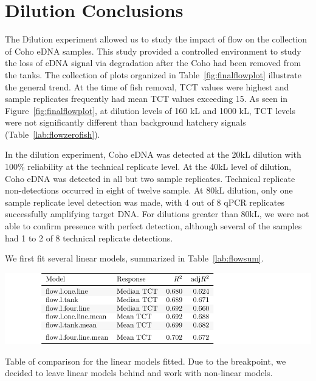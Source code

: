 \section{Dilution Conclusions}

The Dilution experiment allowed us to study the impact of flow on the collection of Coho eDNA samples. This study provided a  controlled environment to study the loss of eDNA signal via degradation  after the Coho had been removed from the tanks. The collection of plots organized in Table~\ref{fig:finalflowplot} illustrate the general trend. At the time of fish removal, TCT values were highest and sample replicates frequently had mean TCT values exceeding 15.  As seen in Figure~\ref{fig:finalflowplot}, at dilution levels of 160 kL and 1000 kL, TCT levels were not significantly different than background hatchery signals (Table~\ref{lab:flowzerofish}).

\vspace{5mm}

In the dilution experiment, Coho eDNA was detected at the 20kL dilution with 100\% reliability at the technical replicate level. At the 40kL level of dilution, Coho eDNA was detected in all but two sample replicates. Technical replicate non-detections occurred in eight of twelve sample. At 80kL dilution, only one sample replicate level detection was made, with 4 out of 8 qPCR replicates successfully amplifying target DNA. For dilutions greater than 80kL, we were not able to confirm presence with perfect detection, although several of the samples had 1 to 2 of 8 technical replicate detections.

\vspace{5mm}

We first fit several linear models, summarized in Table~\ref{lab:flowsum}.

\begin{table}[H]
\includegraphics{Chapter4Images/flowsummary.pdf}
\caption{Table of comparison for the linear models fitted. Due to the breakpoint, we decided to leave linear models behind and work with non-linear models.}
\label{lab:flowsum}
\end{table}

\vspace{5mm}

